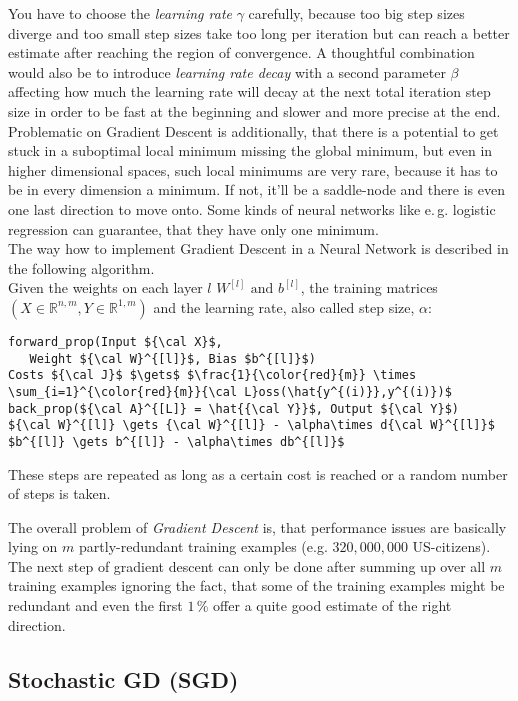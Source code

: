 \documentclass[dvipsnames,twocolumn]{scrartcl}
\begin{document}
	You have to choose the \emph{learning rate} $\gamma$ carefully, because too big step sizes diverge and too small step sizes take too long per iteration but can reach a better estimate after reaching the region of convergence. A thoughtful combination would also be to introduce \emph{learning rate decay} with a second parameter $\beta$ affecting how much the learning rate will decay at the next total iteration step size in order to be fast at the beginning and slower and more precise at the end. Problematic on Gradient Descent is additionally, that there is a potential to get stuck in a suboptimal local minimum missing the global minimum, but even in higher dimensional spaces, such local minimums are very rare, because it has to be in every dimension a minimum. If not, it'll be a saddle-node and there is even one last direction to move onto. Some kinds of neural networks like e.\,g. logistic regression can guarantee, that they have only one minimum.\\
	
	The way how to implement Gradient Descent in a Neural Network is described in the following algorithm.\\
	Given the weights on each layer $l$ $W^{[l]} \text{ and } b^{[l]}$, the training matrices $(X \in \mathbb{R}^{n,m}, Y \in \mathbb{R}^{1,m})$ and the learning rate, also called step size, $\alpha$:
	\begin{lstlisting}[frame=single,caption={Batch Gradient Descent Algorithm}]
forward_prop(Input ${\cal X}$,
   Weight ${\cal W}^{[l]}$, Bias $b^{[l]}$)
Costs ${\cal J}$ $\gets$ $\frac{1}{\color{red}{m}} \times \sum_{i=1}^{\color{red}{m}}{\cal L}oss(\hat{y^{(i)}},y^{(i)})$
back_prop(${\cal A}^{[L]} = \hat{{\cal Y}}$, Output ${\cal Y}$)
${\cal W}^{[l]} \gets {\cal W}^{[l]} - \alpha\times d{\cal W}^{[l]}$
$b^{[l]} \gets b^{[l]} - \alpha\times db^{[l]}$
	\end{lstlisting}
	These steps are repeated as long as a certain cost is reached or a random number of steps is taken.
	
	The overall problem of \emph{Gradient Descent} is, that performance issues are basically lying on $m$ partly-redundant training examples (e.g. $320,000,000$ US-citizens). The next step of gradient descent can only be done after summing up over all $m$ training examples ignoring the fact, that some of the training examples might be redundant and even the first $1$\,\% offer a quite good estimate of the right direction.
	
	\subsection{Stochastic GD (SGD)}
	
\end{document}
